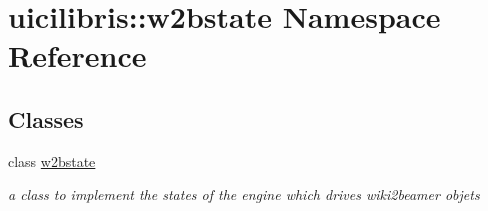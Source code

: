 \hypertarget{namespaceuicilibris_1_1w2bstate}{\section{uicilibris\-:\-:w2bstate \-Namespace \-Reference}
\label{namespaceuicilibris_1_1w2bstate}
}
\subsection*{\-Classes}
\begin{DoxyCompactItemize}
\item 
class \hyperlink{classuicilibris_1_1w2bstate_1_1w2bstate}{w2bstate}
\begin{DoxyCompactList}\small\item\em a class to implement the states of the engine which drives wiki2beamer objets \end{DoxyCompactList}\end{DoxyCompactItemize}
